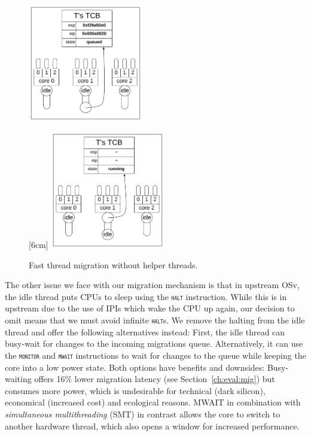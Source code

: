 \documentclass[12pt,a4paper]{book}
\begin{document}
\begin{figure}
{    \includegraphics[width=5cm]{fig_build/mig3}
    }
    \hfill
    \par
    \bigskip
    [6cm]{
    \includegraphics[width=5cm]{fig_build/mig4}
    }
    \caption{Fast thread migration without helper threads.}
    \label{fig:di:mig}
\end{figure}

The other issue we face with our migration mechanism is that in upstream OSv, the idle thread puts CPUs to sleep using the \textsc{\texttt{halt}} instruction.
While this is in upstream due to the use of IPIs which wake the CPU up again, our decision to omit means that we must avoid infinite \textsc{\texttt{halt}}s.
We remove the halting from the idle thread and offer the following alternatives instead:
First, the idle thread can busy-wait for changes to the incoming migrations queue.
Alternatively, it can use the \textsc{\texttt{monitor}} and \textsc{\texttt{mwait}} instructions to wait for changes to the queue while keeping the core into a low power state.
Both options have benefits and downsides:
Busy-waiting offers 16\% lower migration latency (see Section~\ref{ch:eval:mig}) but consumes more power, which is undesirable for technical (dark silicon), economical (increased cost) and ecological reasons.
MWAIT in combination with \emph{simultaneous multithreading} (SMT) in contrast allows the core to switch to another hardware thread, which also opens a window for increased performance.~\cite{intelSDMMWAIT,darkSilicon}
\end{document}
